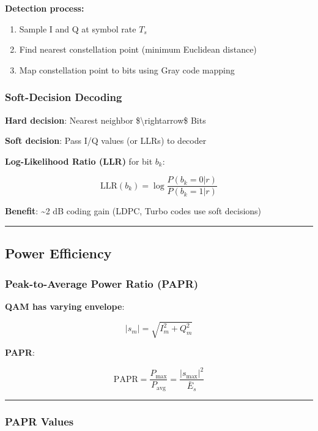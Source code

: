 \textbf{Detection process:}
\begin{enumerate}
\item Sample I and Q at symbol rate $T_s$
\item Find nearest constellation point (minimum Euclidean distance)
\item Map constellation point to bits using Gray code mapping
\end{enumerate}

\subsubsection{Soft-Decision Decoding}\label{soft-decision-decoding}

\textbf{Hard decision}: Nearest neighbor \$\textbackslash rightarrow\$
Bits

\textbf{Soft decision}: Pass I/Q values (or LLRs) to decoder

\textbf{Log-Likelihood Ratio (LLR)} for bit \(b_k\):

\[
\text{LLR}(b_k) = \log\frac{P(b_k=0 | r)}{P(b_k=1 | r)}
\]

\textbf{Benefit}: \textasciitilde2 dB coding gain (LDPC, Turbo codes use
soft decisions)

\begin{center}\rule{0.5\linewidth}{0.5pt}\end{center}

\subsection{Power Efficiency}\label{power-efficiency}

\subsubsection{Peak-to-Average Power Ratio
(PAPR)}\label{peak-to-average-power-ratio-papr}

\textbf{QAM has varying envelope}:

\[
|s_m| = \sqrt{I_m^2 + Q_m^2}
\]

\textbf{PAPR}:

\[
\text{PAPR} = \frac{P_{\max}}{P_{\text{avg}}} = \frac{|s_{\max}|^2}{\bar{E}_s}
\]

\begin{center}\rule{0.5\linewidth}{0.5pt}\end{center}

\subsubsection{PAPR Values}\label{papr-values}

